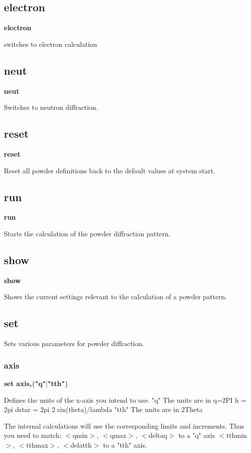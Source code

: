 \subsection*{electron}
{\bf electron \par }
\par
\vspace{3pt}
switches to electron calculation 
\subsection*{neut}
{\bf neut \par }
\par
\vspace{3pt}
Switches to neutron diffraction. 
\subsection*{reset}
{\bf reset \par }
\par
\vspace{3pt}
Reset all powder definitions back to the default values at 
system start. 
\subsection*{run}
{\bf run \par }
\par
\vspace{3pt}
Starts the calculation of the powder diffraction pattern. 
\subsection*{show}
{\bf show \par }
\par
\vspace{3pt}
Shows the current settings relevant to the calculation of a 
powder pattern. 
\subsection*{set}
\par
Sets various parameters for powder diffraction. 
\par
\subsubsection{axis}
{\bf set axis,$ \{$"q"$| $"tth"$\} $ \par }
\par
\vspace{3pt}
Defines the units of the x-axis you intend to use. 
"q"    The units are in q=2PI h = 2pi dstar = 2pi 2 sin(theta)/lambda 
"tth"  The units are in 2Theta 
\par
The internal calculations will use the corresponding limits and 
increments.  Thus you need to match: 
$ <$qmin$> $,   $ <$qmax$> $,   $ <$deltaq$> $  to a "q" axis 
$ <$tthmin$> $, $ <$tthmax$> $, $ <$delatth$> $ to a "tth" axis. 
